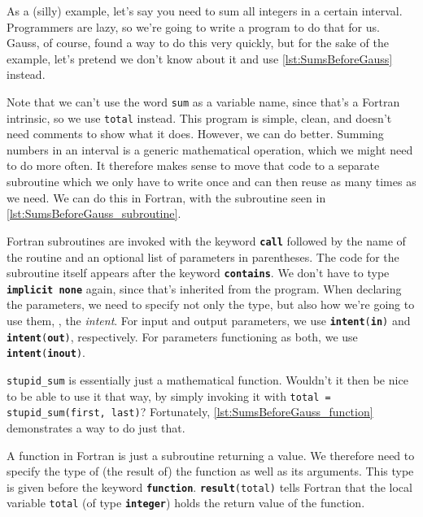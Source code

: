 \documentclass[openany,oneside]{report}
\newcommand{\keyword}[1]{\texttt{\bfseries\color{DarkRed}#1}}
\begin{document}
As a (silly) example, let's say you need to sum all integers in a certain interval.
Programmers are lazy, so we're going to write a program to do that for us.
Gauss, of course, found a way to do this very quickly, but for the sake of the example, let's pretend we don't know about it and use \autoref{lst:SumsBeforeGauss} instead.

Note that we can't use the word \texttt{sum} as a variable name, since that's a Fortran intrinsic, so we use \texttt{total} instead.
This program is simple, clean, and doesn't need comments to show what it does.
However, we can do better.
Summing numbers in an interval is a generic mathematical operation, which we might need to do more often.
It therefore makes sense to move that code to a separate subroutine which we only have to write once and can then reuse as many times as we need.
We can do this in Fortran, with the subroutine seen in \autoref{lst:SumsBeforeGauss_subroutine}.

Fortran subroutines are invoked with the keyword \keyword{call} followed by the name of the routine and an optional list of parameters in parentheses.
The code for the subroutine itself appears after the keyword \keyword{contains}.
We don't have to type \keyword{implicit none} again, since that's inherited from the program.
When declaring the parameters, we need to specify not only the type, but also how we're going to use them, \ie, the \emph{intent}.
For input and output parameters, we use \texttt{\keyword{intent}(\keyword{in})} and \texttt{\keyword{intent}(\keyword{out})}, respectively.
For parameters functioning as both, we use \texttt{\keyword{intent}(\keyword{inout})}.

\texttt{stupid\_sum} is essentially just a mathematical function.
Wouldn't it then be nice to be able to use it that way, by simply invoking it with \texttt{total = stupid\_sum(first, last)}? 
Fortunately, \autoref{lst:SumsBeforeGauss_function} demonstrates a way to do just that.

A function in Fortran is just a subroutine returning a value.
We therefore need to specify the type of (the result of) the function as well as its arguments.
This type is given before the keyword \keyword{function}.
\texttt{\keyword{result}(total)} tells Fortran that the local variable \texttt{total} (of type \keyword{integer}) holds the return value of the function.
\end{document}
